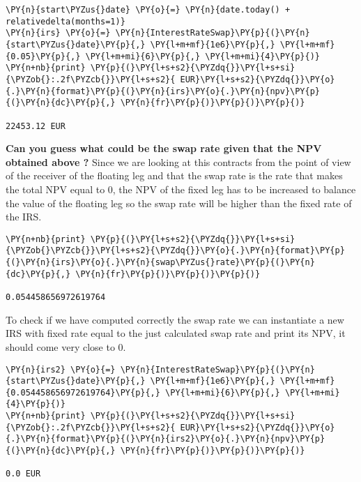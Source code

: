 \begin{codebox}[breakable, size=fbox, boxrule=1pt, pad at break*=1mm,colback=cellbackground, colframe=cellborder]
\begin{Verbatim}[commandchars=\\\{\}]
\PY{n}{start\PYZus{}date} \PY{o}{=} \PY{n}{date.today() + relativedelta(months=1)}
\PY{n}{irs} \PY{o}{=} \PY{n}{InterestRateSwap}\PY{p}{(}\PY{n}{start\PYZus{}date}\PY{p}{,} \PY{l+m+mf}{1e6}\PY{p}{,} \PY{l+m+mf}{0.05}\PY{p}{,} \PY{l+m+mi}{6}\PY{p}{,} \PY{l+m+mi}{4}\PY{p}{)}
\PY{n+nb}{print} \PY{p}{(}\PY{l+s+s2}{\PYZdq{}}\PY{l+s+si}{\PYZob{}:.2f\PYZcb{}}\PY{l+s+s2}{ EUR}\PY{l+s+s2}{\PYZdq{}}\PY{o}{.}\PY{n}{format}\PY{p}{(}\PY{n}{irs}\PY{o}{.}\PY{n}{npv}\PY{p}{(}\PY{n}{dc}\PY{p}{,} \PY{n}{fr}\PY{p}{)}\PY{p}{)}\PY{p}{)}

22453.12 EUR
\end{Verbatim}
\end{codebox}

\textbf{Can you guess what could be the \textbf{swap rate} given that the NPV obtained above ?}
Since we are looking at this contracts from the point of view
of the receiver of the floating leg and that the swap rate is the rate that makes the total NPV equal to 0, the NPV of the fixed leg has to be increased to balance the value of the floating leg so the swap rate will be higher than the fixed rate of the IRS.

\begin{codebox}[breakable, size=fbox, boxrule=1pt, pad at break*=1mm,colback=cellbackground, colframe=cellborder]
\begin{Verbatim}[commandchars=\\\{\}]
\PY{n+nb}{print} \PY{p}{(}\PY{l+s+s2}{\PYZdq{}}\PY{l+s+si}{\PYZob{}\PYZcb{}}\PY{l+s+s2}{\PYZdq{}}\PY{o}{.}\PY{n}{format}\PY{p}{(}\PY{n}{irs}\PY{o}{.}\PY{n}{swap\PYZus{}rate}\PY{p}{(}\PY{n}{dc}\PY{p}{,} \PY{n}{fr}\PY{p}{)}\PY{p}{)}\PY{p}{)}

0.054458656972619764
\end{Verbatim}
\end{codebox}
    
To check if we have computed correctly the swap rate we can
instantiate a new IRS with fixed rate equal to the just calculated swap
rate and print its NPV, it should come very close to 0.

\begin{codebox}[breakable, size=fbox, boxrule=1pt, pad at break*=1mm,colback=cellbackground, colframe=cellborder]
\begin{Verbatim}[commandchars=\\\{\}]
\PY{n}{irs2} \PY{o}{=} \PY{n}{InterestRateSwap}\PY{p}{(}\PY{n}{start\PYZus{}date}\PY{p}{,} \PY{l+m+mf}{1e6}\PY{p}{,} \PY{l+m+mf}{0.054458656972619764}\PY{p}{,} \PY{l+m+mi}{6}\PY{p}{,} \PY{l+m+mi}{4}\PY{p}{)}
\PY{n+nb}{print} \PY{p}{(}\PY{l+s+s2}{\PYZdq{}}\PY{l+s+si}{\PYZob{}:.2f\PYZcb{}}\PY{l+s+s2}{ EUR}\PY{l+s+s2}{\PYZdq{}}\PY{o}{.}\PY{n}{format}\PY{p}{(}\PY{n}{irs2}\PY{o}{.}\PY{n}{npv}\PY{p}{(}\PY{n}{dc}\PY{p}{,} \PY{n}{fr}\PY{p}{)}\PY{p}{)}\PY{p}{)}

0.0 EUR
\end{Verbatim}
\end{codebox}
    
